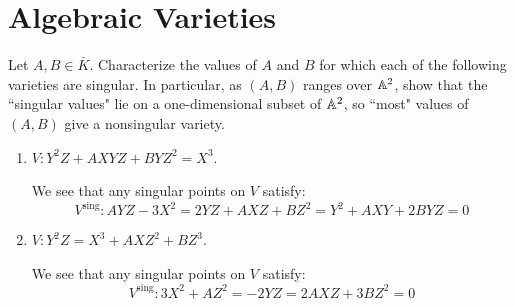 \documentclass[12pt,reqno]{amsart}
\begin{document}
\section{Algebraic Varieties}
\begin{exe}
Let $A, B\in \bar{K}$. Characterize the values of $A$ and $B$ for which each of the following varieties are singular. In particular, as $(A, B)$ ranges over ${\mathbb A}^2$, show that the ``singular values" lie on a one-dimensional subset of ${\mathbb A}^2$, so ``most" values of $(A, B)$ give a nonsingular variety.
\begin{enumerate}
\item $V: Y^{2}Z+AXYZ+BYZ^{2}=X^{3}$.
\begin{solution}
We see that any singular points on $V$ satisfy:\\
\[
V^{\text{sing}}:  AYZ-3X^2=2YZ+AXZ+BZ^2=Y^2+AXY+2BYZ =0
\]
\end{solution}

\item $V: Y^{2}Z=X^{3}+AXZ^{2}+BZ^{3}$.
\begin{solution}
We see that any singular points on $V$ satisfy:\\
\[
V^{\text{sing}}:  3X^2+AZ^2=-2YZ=2AXZ+3BZ^2=0
\]
\end{solution}
\end{enumerate}
\end{exe} 
\end{document}
